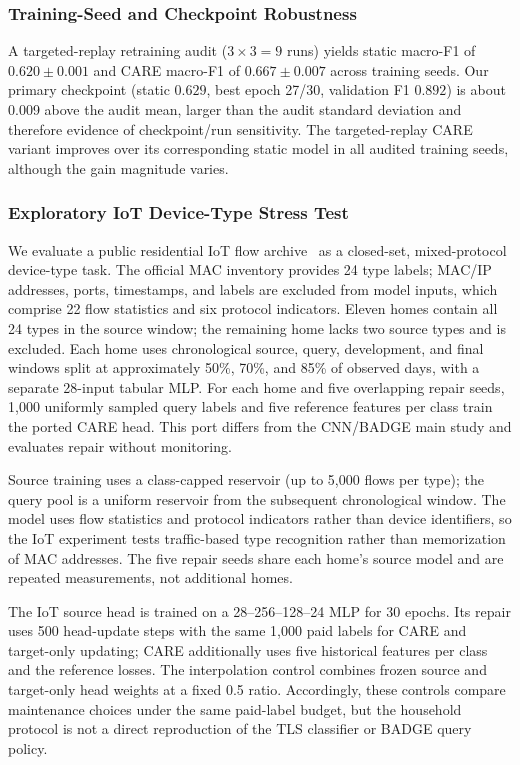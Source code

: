 \documentclass[journal]{IEEEtran}
\begin{document}
\subsubsection{Training-Seed and Checkpoint Robustness}
\label{sec:checkpoint_robustness}

A targeted-replay retraining audit ($3{\times}3{=}9$ runs) yields static macro-F1 of $0.620{\pm}0.001$ and CARE macro-F1 of $0.667{\pm}0.007$ across training seeds.
Our primary checkpoint (static $0.629$, best epoch 27/30, validation F1 $0.892$) is about 0.009 above the audit mean, larger than the audit standard deviation and therefore evidence of checkpoint/run sensitivity. The targeted-replay CARE variant improves over its corresponding static model in all audited training seeds, although the gain magnitude varies.

\subsubsection{Exploratory IoT Device-Type Stress Test}
\label{sec:iot_homes}


We evaluate a public residential IoT flow archive~\cite{pashamokhtari2023dynamic} as a closed-set, mixed-protocol device-type task. The official MAC inventory provides 24 type labels; MAC/IP addresses, ports, timestamps, and labels are excluded from model inputs, which comprise 22 flow statistics and six protocol indicators. Eleven homes contain all 24 types in the source window; the remaining home lacks two source types and is excluded. Each home uses chronological source, query, development, and final windows split at approximately 50\%, 70\%, and 85\% of observed days, with a separate 28-input tabular MLP. For each home and five overlapping repair seeds, 1{,}000 uniformly sampled query labels and five reference features per class train the ported CARE head. This port differs from the CNN/BADGE main study and evaluates repair without monitoring.

Source training uses a class-capped reservoir (up to 5{,}000 flows per type); the query pool is a uniform reservoir from the subsequent chronological window. The model uses flow statistics and protocol indicators rather than device identifiers, so the IoT experiment tests traffic-based type recognition rather than memorization of MAC addresses. The five repair seeds share each home's source model and are repeated measurements, not additional homes.

The IoT source head is trained on a 28--256--128--24 MLP for 30 epochs. Its repair uses 500 head-update steps with the same 1{,}000 paid labels for CARE and target-only updating; CARE additionally uses five historical features per class and the reference losses. The interpolation control combines frozen source and target-only head weights at a fixed 0.5 ratio. Accordingly, these controls compare maintenance choices under the same paid-label budget, but the household protocol is not a direct reproduction of the TLS classifier or BADGE query policy.
\end{document}

